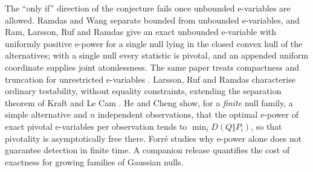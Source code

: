 \documentclass[11pt,a4paper]{article}
\theoremstyle{definition}
\theoremstyle{remark}
\begin{document}
The ``only if'' direction of the conjecture fails once unbounded e-variables are allowed. Ramdas and Wang \cite[Example~3.15]{RamdasWang} separate bounded from unbounded e-variables, and Ram, Larsson, Ruf and Ramdas \cite[Example~5.1]{GROW} give an exact unbounded e-variable with uniformly positive e-power for a single null lying in the closed convex hull of the alternatives; with a single null every statistic is pivotal, and an appended uniform coordinate supplies joint atomlessness. The same paper treats compactness and truncation for unrestricted e-variables \cite[Theorem~4.17]{GROW}. Larsson, Ruf and Ramdas \cite{LRR} characterise ordinary testability, without equality constraints, extending the separation theorem of Kraft and Le Cam \cite{LeCam}. He and Cheng \cite{HeCheng} show, for a \emph{finite} null family, a simple alternative and \(n\) independent observations, that the optimal e-power of exact pivotal e-variables per observation tends to \(\min_iD(Q\Vert P_i)\), so that pivotality is asymptotically free there. Forr\'e \cite{Forre,ForreTail} studies why e-power alone does not guarantee detection in finite time. A companion release \cite{companion} quantifies the cost of exactness for growing families of Gaussian nulls.
\end{document}
